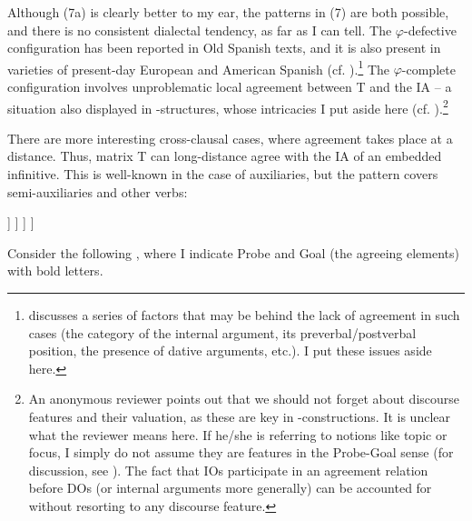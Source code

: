 \documentclass[output=paper]{langsci/langscibook}
\begin{document}
Although (7a) is clearly better to my ear, the patterns in (7) are both possible, and there is no consistent dialectal tendency, as far as I can tell. The $\varphi $-defective configuration has been reported in Old Spanish texts, and it is also present in varieties of present-day European and American Spanish (cf. \citealt{Mendikoetxea1999}).\footnote{\citet{RAE-ASALE2009} discusses a series of factors that may be behind the lack of agreement in such cases (the category of the internal argument, its preverbal\slash postverbal position, the presence of dative arguments, etc.). I put these issues aside here.} The $\varphi $-complete configuration involves unproblematic local agreement between T and the IA – a situation also displayed in \DAT-\NOM structures, whose intricacies I put aside here (cf. \citealt{López2007,Chomsky2008}).\footnote{An anonymous reviewer points out that we should not forget about discourse features and their valuation, as these are key in \DAT-\NOM constructions. It is unclear what the reviewer means here. If he\slash she is referring to notions like topic or focus, I simply do not assume they are features in the Probe-Goal sense (for discussion, see \citealt{Chomsky2001Derivation,Chomsky2008,Chomsky2017,Ott2016}). The fact that IOs participate in an agreement relation before DOs (or internal arguments more generally)  can be accounted for without resorting to any discourse feature.} 

There are more interesting cross-clausal cases, where agreement takes place at a distance. Thus, matrix T can long-distance agree with the IA of an embedded infinitive. This is well-known in the case of auxiliaries, but the pattern covers semi-auxiliaries and other verbs: 

\ea%
\settowidth\jamwidth{[\textsc{semiaux} = try, need, etc.]}
    \label{ex:gallego:8}
    \ea\relax [ T [ SE  V\textsubscript{AUX}         [ INF XP ] ] ]      \jambox{[\textsc{aux} = can, should, etc.]}
    \ex\relax [ T [ SE  V\textsubscript{SEMIAUX}  [ INF XP ] ] ]         \jambox{[\textsc{semiaux} = try, need, etc.]}
    \z
\z    

Consider the following \citep[Chapter~28]{RAE-ASALE2009}, where I indicate Probe and Goal (the agreeing elements) with bold letters.
\end{document}
